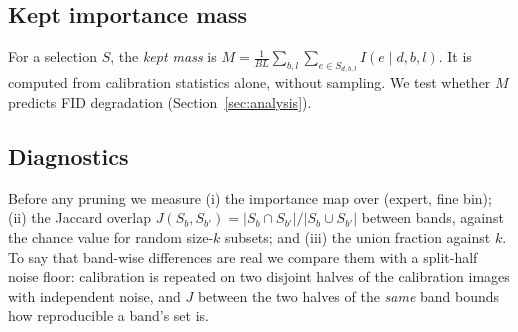 \subsection{Kept importance mass}\label{sec:mass}
For a selection $S$, the \emph{kept mass} is $M=\frac{1}{BL}\sum_{b,l}\sum_{e\in S_{d,b,l}} I(e\mid d,b,l)$. It is computed from calibration statistics alone, without sampling. We test whether $M$ predicts FID degradation (Section~\ref{sec:analysis}).

\subsection{Diagnostics}\label{sec:diag}
Before any pruning we measure (i) the importance map over (expert, fine bin); (ii) the Jaccard overlap $J(S_b,S_{b'})=|S_b\cap S_{b'}|/|S_b\cup S_{b'}|$ between bands, against the chance value for random size-$k$ subsets; and (iii) the union fraction against $k$.
To say that band-wise differences are real we compare them with a split-half noise floor: calibration is repeated on two disjoint halves of the calibration images with independent noise, and $J$ between the two halves of the \emph{same} band bounds how reproducible a band's set is.
